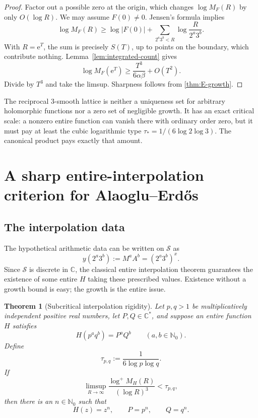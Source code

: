 \documentclass[11pt,oneside]{article}
\newtheorem{theorem}{Theorem}[section]
\theoremstyle{definition}
\theoremstyle{remark}
\newcommand{\Nzero}{\mathbb N_0}
\newcommand{\C}{\mathbb C}
\newcommand{\e}{\mathrm e}
\newcommand{\AEconj}{Alaoglu--Erd\H{o}s}
\begin{document}
\begin{proof}
Factor out a possible zero at the origin, which changes \(\log M_F(R)\) by only \(O(\log R)\).  We may assume \(F(0)\ne0\).  Jensen's formula implies
\[
  \log M_F(R)
  \ge \log|F(0)|+
  \sum_{2^a3^b<R}\log\frac{R}{2^a3^b}.
\]
With \(R=\e^T\), the sum is precisely \(S(T)\), up to points on the boundary, which contribute nothing.  Lemma~\ref{lem:integrated-count} gives
\[
  \log M_F(\e^T)
  \ge \frac{T^3}{6\alpha\beta}+O(T^2).
\]
Divide by \(T^3\) and take the limsup.  Sharpness follows from \cref{thm:E-growth}.
\end{proof}

\begin{resultbox}
The reciprocal \(3\)-smooth lattice is neither a uniqueness set for arbitrary holomorphic functions nor a zero set of negligible growth.  It has an exact critical scale: a nonzero entire function can vanish there with ordinary order zero, but it must pay at least the cubic logarithmic type
\(\tau_*=1/(6\log2\log3)\).  The canonical product pays exactly that amount.
\end{resultbox}

\section{A sharp entire-interpolation criterion for \AEconj}

\subsection{The interpolation data}

The hypothetical arithmetic data can be written on \(\mathcal S\) as
\begin{equation}
  y(2^a3^b):=M^aA^b=(2^a3^b)^x.
  \label{eq:data-S}
\end{equation}
Since \(\mathcal S\) is discrete in \(\C\), the classical entire interpolation theorem guarantees the existence of some entire \(H\) taking these prescribed values.  Existence without a growth bound is easy; the growth is the entire issue.

\begin{theorem}[Subcritical interpolation rigidity]
\label{thm:subcritical}
Let \(p,q>1\) be multiplicatively independent positive real numbers, let \(P,Q\in\C^*\), and suppose an entire function \(H\) satisfies
\begin{equation}
  H(p^aq^b)=P^aQ^b
  \qquad(a,b\in\Nzero).
  \label{eq:general-interp}
\end{equation}
Define
\[
  \tau_{p,q}:=\frac1{6\log p\log q}.
\]
If
\begin{equation}
  \limsup_{R\to\infty}
  \frac{\log^+M_H(R)}{(\log R)^3}
  <\tau_{p,q},
  \label{eq:subcritical-bound}
\end{equation}
then there is an \(n\in\Nzero\) such that
\[
  H(z)=z^n,
  \qquad P=p^n,
  \qquad Q=q^n.
\]
\end{theorem}
\end{document}
